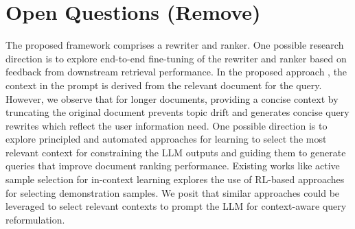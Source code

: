 \section{Open Questions (Remove)}
 \label{open_questions}


The proposed framework \car{} comprises a rewriter and ranker. One possible research direction is to explore end-to-end fine-tuning of the rewriter and ranker based on feedback from downstream retrieval performance. In the proposed approach \car{}, the context in the prompt is derived from the relevant document for the query. However, we observe that for longer documents, providing a concise context by truncating the original document prevents topic drift and generates concise query rewrites which reflect the user information need. One possible direction is to explore principled and automated approaches for learning to select the most relevant context for constraining the LLM outputs and guiding them to generate queries that improve document ranking performance. Existing works like active sample selection \cite{zhang-etal-2022-active} for in-context learning explores the use of RL-based approaches for selecting demonstration samples. We posit that similar approaches could be leveraged to select relevant contexts to prompt the LLM for context-aware query reformulation.

 


